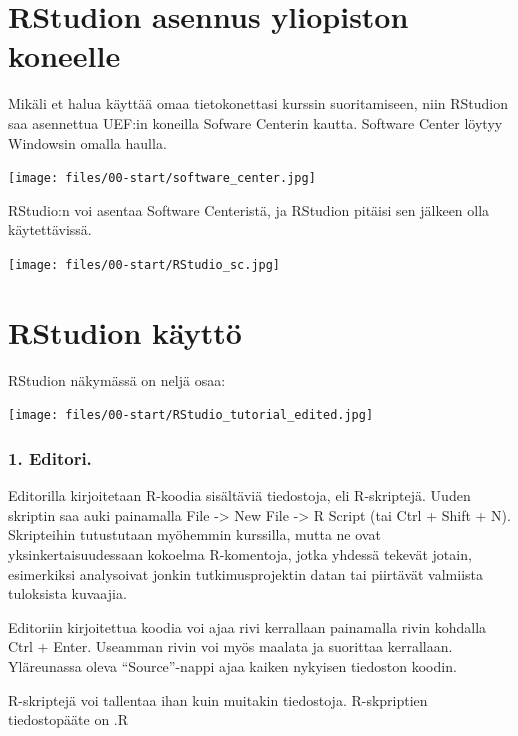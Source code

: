 \documentclass[
]{book}
\begin{document}
\hypertarget{rstudion-asennus-yliopiston-koneelle}{%
\section*{RStudion asennus yliopiston koneelle}\label{rstudion-asennus-yliopiston-koneelle}}

Mikäli et halua käyttää omaa tietokonettasi kurssin suoritamiseen, niin RStudion saa asennettua UEF:in koneilla Sofware Centerin kautta. Software Center löytyy Windowsin omalla haulla.

\texttt{[image: files/00-start/software\_center.jpg]}

RStudio:n voi asentaa Software Centeristä, ja RStudion pitäisi sen jälkeen olla käytettävissä.

\texttt{[image: files/00-start/RStudio\_sc.jpg]}

\hypertarget{rstudion-kuxe4yttuxf6}{%
\section*{RStudion käyttö}\label{rstudion-kuxe4yttuxf6}}

RStudion näkymässä on neljä osaa:

\texttt{[image: files/00-start/RStudio\_tutorial\_edited.jpg]}

\hypertarget{editori.}{%
\subsubsection*{1. Editori.}\label{editori.}}

Editorilla kirjoitetaan R-koodia sisältäviä tiedostoja, eli R-skriptejä. Uuden skriptin saa auki painamalla File -\textgreater{} New File -\textgreater{} R Script (tai Ctrl + Shift + N). Skripteihin tutustutaan myöhemmin kurssilla, mutta ne ovat yksinkertaisuudessaan kokoelma R-komentoja, jotka yhdessä tekevät jotain, esimerkiksi analysoivat jonkin tutkimusprojektin datan tai piirtävät valmiista tuloksista kuvaajia.

Editoriin kirjoitettua koodia voi ajaa rivi kerrallaan painamalla rivin kohdalla Ctrl + Enter. Useamman rivin voi myös maalata ja suorittaa kerrallaan. Yläreunassa oleva ``Source''-nappi ajaa kaiken nykyisen tiedoston koodin.

R-skriptejä voi tallentaa ihan kuin muitakin tiedostoja. R-skpriptien tiedostopääte on .R
\end{document}
